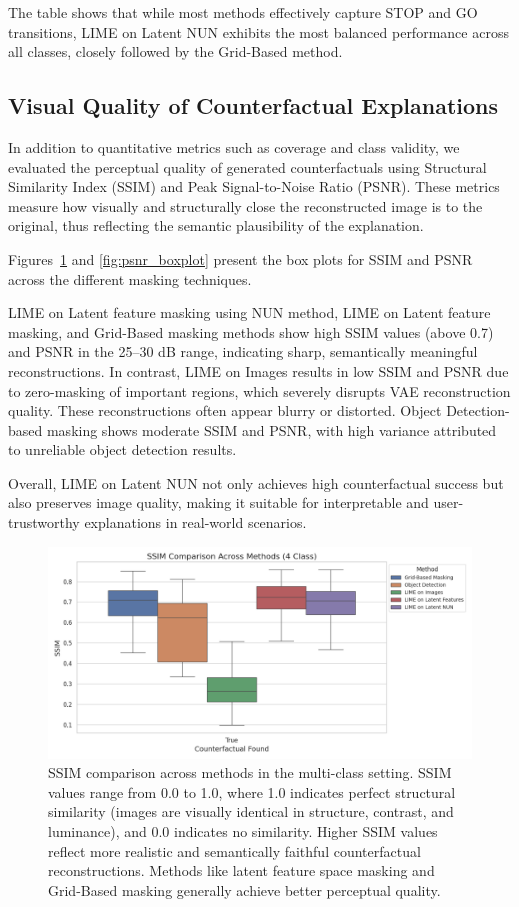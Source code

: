 The table shows that while most methods effectively capture STOP and GO transitions, LIME on Latent NUN exhibits the most balanced performance across all classes, closely followed by the Grid-Based method.

\subsection{Visual Quality of Counterfactual Explanations} \label{subsec:visual_quality}
In addition to quantitative metrics such as coverage and class validity, we evaluated the perceptual quality of generated counterfactuals using Structural Similarity Index (SSIM) and Peak Signal-to-Noise Ratio (PSNR). These metrics measure how visually and structurally close the reconstructed image is to the original, thus reflecting the semantic plausibility of the explanation.

Figures~\ref{fig:ssim_boxplot} and \ref{fig:psnr_boxplot} present the box plots for SSIM and PSNR across the different masking techniques.

LIME on Latent feature masking using NUN method, LIME on Latent feature masking, and Grid-Based masking methods show high SSIM values (above 0.7) and PSNR in the 25--30 dB range, indicating sharp, semantically meaningful reconstructions. In contrast, LIME on Images results in low SSIM and PSNR due to zero-masking of important regions, which severely disrupts VAE reconstruction quality. These reconstructions often appear blurry or distorted. Object Detection-based masking shows moderate SSIM and PSNR, with high variance attributed to unreliable object detection results.


Overall, LIME on Latent NUN not only achieves high counterfactual success but also preserves image quality, making it suitable for interpretable and user-trustworthy explanations in real-world scenarios.


\begin{figure}[htbp]
    \centering
    \includegraphics[width=\textwidth]{img/masking_results/ssim_boxplot_4_class.png}
    \caption{
        SSIM comparison across methods in the multi-class setting. SSIM values range from 0.0 to 1.0, where 1.0 indicates perfect structural similarity (images are visually identical in structure, contrast, and luminance), and 0.0 indicates no similarity. Higher SSIM values reflect more realistic and semantically faithful counterfactual reconstructions. Methods like latent feature space masking and Grid-Based masking generally achieve better perceptual quality.
    }
    \label{fig:ssim_boxplot}
\end{figure}

